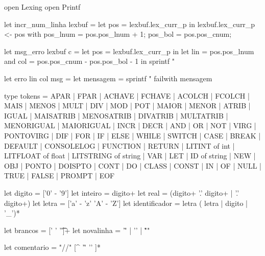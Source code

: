 \documentclass[12pt,a4paper,twoside]{article}
\begin{document}
\begin{terminal}
{
  open Lexing
  open Printf

  let incr_num_linha lexbuf = 
    let pos = lexbuf.lex_curr_p in
     lexbuf.lex_curr_p <- { pos with
        pos_lnum = pos.pos_lnum + 1;
        pos_bol = pos.pos_cnum;
     }

  let msg_erro lexbuf c =
    let pos = lexbuf.lex_curr_p in
    let lin = pos.pos_lnum
    and col = pos.pos_cnum - pos.pos_bol - 1 in
    sprintf "%

  let erro lin col msg =
    let mensagem = sprintf "%
       failwith mensagem


type tokens = APAR
            | FPAR
            | ACHAVE
            | FCHAVE
            | ACOLCH
            | FCOLCH
            | MAIS
            | MENOS
            | MULT
            | DIV
            | MOD
            | POT
            | MAIOR
            | MENOR
            | ATRIB
            | IGUAL
            | MAISATRIB
            | MENOSATRIB
            | DIVATRIB
            | MULTATRIB
            | MENORIGUAL
            | MAIORIGUAL
            | INCR
            | DECR
            | AND
            | OR
            | NOT
            | VIRG
            | PONTOVIRG
            | DIF
            | FOR
            | IF
            | ELSE
            | WHILE
            | SWITCH
            | CASE
            | BREAK
            | DEFAULT
            | CONSOLELOG
            | FUNCTION
            | RETURN
            | LITINT of int
            | LITFLOAT of float
            | LITSTRING of string
            | VAR 
            | LET
            | ID of string
            | NEW
            | OBJ
            | PONTO
            | DOISPTO
            | CONT
            | DO
            | CLASS
            | CONST
            | IN
            | OF
            | NULL
            | TRUE
            | FALSE
            | PROMPT
            | EOF
}

let digito = ['0' - '9']
let inteiro = digito+
let real = (digito+ '.' digito+ | '.' digito+)
let letra = ['a' - 'z' 'A' - 'Z']
let identificador = letra ( letra | digito | '_')*

let brancos = [' ' '\t']+
let novalinha = '\r' | '\n' | "\r\n"

let comentario = "//" [^ '\r' '\n' ]*


\end{terminal}
\end{document}
